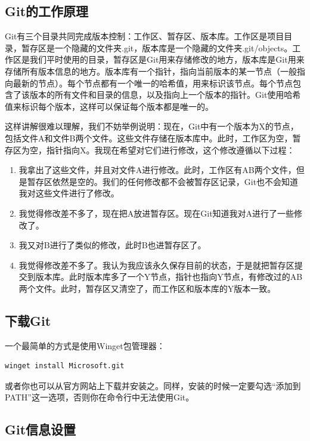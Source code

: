 \documentclass[../main.tex]{subfiles}
\begin{document}
\subsection{Git的工作原理}

Git有三个目录共同完成版本控制：工作区、暂存区、版本库。工作区是项目目录，暂存区是一个隐藏的文件夹.git，版本库是一个隐藏的文件夹.git/objects。工作区是我们平时使用的目录，暂存区是Git用来存储修改的地方，版本库是Git用来存储所有版本信息的地方。版本库有一个指针，指向当前版本的某一节点（一般指向最新的节点）。每个节点都有一个唯一的哈希值，用来标识该节点。每个节点包含了该版本的所有文件和目录的信息，以及指向上一个版本的指针。Git使用哈希值来标识每个版本，这样可以保证每个版本都是唯一的。

这样讲解很难以理解，我们不妨举例说明：现在，Git中有一个版本为X的节点，包括文件A和文件B两个文件。这些文件存储在版本库中。此时，工作区为空，暂存区为空，指针指向X。我现在希望对它们进行修改，这个修改遵循以下过程：

\begin{enumerate}
    \item 我拿出了这些文件，并且对文件A进行修改。此时，工作区有AB两个文件，但是暂存区依然是空的。我们的任何修改都不会被暂存区记录，Git也不会知道我对这些文件进行了修改。
    \item 我觉得修改差不多了，现在把A放进暂存区。现在Git知道我对A进行了一些修改了。
    \item 我又对B进行了类似的修改，此时B也进暂存区了。
    \item 我觉得修改差不多了。我认为我应该永久保存目前的状态，于是就把暂存区提交到版本库。此时版本库多了一个Y节点，指针也指向Y节点，有修改过的AB两个文件。此时，暂存区又清空了，而工作区和版本库的Y版本一致。
\end{enumerate}

\subsection{下载Git}

一个最简单的方式是使用Winget包管理器：

\begin{lstlisting}[language=bash]
    winget install Microsoft.git
\end{lstlisting}

或者你也可以从官方网站上下载并安装之。同样，安装的时候一定要勾选“添加到PATH”这一选项，否则你在命令行中无法使用Git。

\subsection{Git信息设置}
\end{document}
